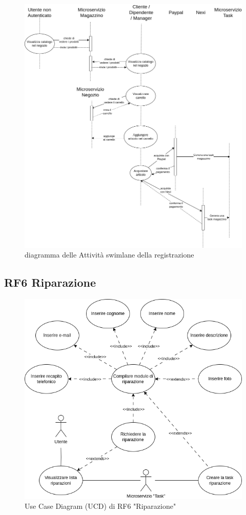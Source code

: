 \documentclass{report}
\begin{document}
\begin{figure}[H]
	\centering\includegraphics[width=1\textwidth]{images/negozio_sequence_diagram.png}
	diagramma delle Attività swimlane della registrazione
\end{figure}

\subsection*{RF6 Riparazione}
\begin{figure}[H]
	\centering\includegraphics[width=1\textwidth]{images/UCD/RF6_riparazione_UCD.png}
	Use Case Diagram (UCD) di RF6 "Riparazione"
\end{figure}
\end{document}
